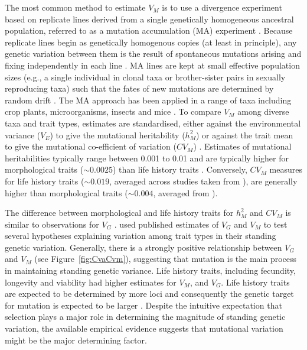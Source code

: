The most common method to estimate $V_M$ is to use a divergence experiment based on replicate lines derived from a single genetically homogeneous ancestral population, referred to as a mutation accumulation (MA) experiment \citep{Muka64, John05, Hall09}. Because replicate lines begin as genetically homogenous copies (at least in principle), any genetic variation between them is the result of spontaneous mutations arising and fixing independently in each line \citep{Hall09}. MA lines are kept at small effective population sizes (e.g., a single individual in clonal taxa or brother-sister pairs in sexually reproducing taxa) such that the fates of new mutations are determined by random drift \citep{Lync98}. The MA approach has been applied in a range of taxa including crop plants, microorganisms, insects and mice \citep{Houl96, Lync99}. To compare $V_M$ among diverse taxa and trait types, estimates are standardised, either against the environmental variance ($V_E$) to give the mutational heritability ($h_M^2$) or against the trait mean to give the mutational co-efficient of variation ($CV_M$) \citep{Houl96, Hall09}. Estimates of mutational heritabilities typically range between 0.001 to 0.01 and are typically higher for morphological traits ($\sim0.0025$) than life history traits \citep[$\sim0.0013$][]{Lync99}. Conversely, $CV_M$ measures for life history traits ($\sim0.019$, averaged across studies taken from \citealt{Houl96, Hall09}), are generally higher than morphological traits ($\sim0.004$, averaged from \citealt{Houl96}). \par

The difference between morphological and life history traits for $h_M^2$ and $CV_M$ is similar to observations for $V_G$ \citep{Houl92a}.  \citet{Houl92a} used published estimates of $V_G$ and $V_M$ to test several hypotheses explaining variation among trait types in their standing genetic variation. Generally, there is a strongly positive relationship between $V_G$ and $V_M$ (see Figure~\ref{fig:CvaCvm}), suggesting that mutation is the main process in maintaining standing genetic variance. Life history traits, including fecundity, longevity and viability had higher estimates for $V_M$, and $V_G$. Life history traits are expected to be determined by more loci and consequently the genetic target for mutation is expected to be larger \citep{Houl98}. Despite the intuitive expectation that selection plays a major role in determining the magnitude of standing genetic variation, the available empirical evidence suggests that mutational variation might be the major determining factor. \par

